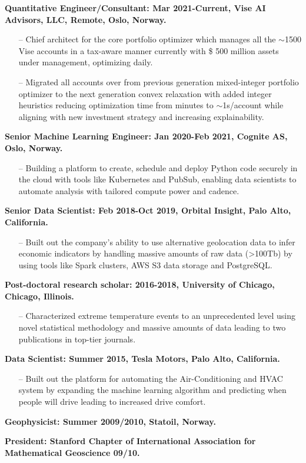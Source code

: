\documentclass[letterpaper, 12pt]{article}
\renewenvironment{itemize}{
  \begin{list}{}{
    \setlength{\leftmargin}{1.5em}
  }
}{
  \end{list}
}
\begin{document}
\begin{itemize}
  \item \textbf{Quantitative Engineer/Consultant: Mar 2021-Current, Vise AI Advisors, LLC, Remote, Oslo, Norway. }
  \begin{enumerate}
       \item[--] Chief architect for the core portfolio optimizer which manages all the $\sim$1500 Vise accounts in a tax-aware manner currently with \$ 500 million assets under management, optimizing daily.
       \item[--] Migrated all accounts over from previous generation mixed-integer portfolio optimizer to the next generation convex relaxation with added integer heuristics reducing optimization time from minutes to $\sim$1s/account while aligning with new investment strategy and increasing explainability.
   \end{enumerate}
  
  \item \textbf{Senior Machine Learning Engineer: Jan 2020-Feb 2021, Cognite AS, Oslo, Norway. }
  \begin{enumerate}
       \item[--] Building a platform to create, schedule and deploy Python code securely in the cloud with tools like Kubernetes and PubSub, enabling data scientists to automate analysis with tailored compute power and cadence.
   \end{enumerate}
  \item \textbf{Senior Data Scientist: Feb 2018-Oct 2019, Orbital Insight, Palo Alto, California. }
  \begin{enumerate}
       \item[--] Built out the company's ability to use alternative geolocation data to infer economic indicators by handling massive amounts of raw data (>100Tb) by using tools like Spark clusters, AWS S3 data storage and PostgreSQL.
   \end{enumerate}
  \newpage
  \item \textbf{Post-doctoral research scholar: 2016-2018, University of Chicago, Chicago, Illinois.}
  \begin{enumerate}
       \item[--] Characterized extreme temperature events to an unprecedented level using novel statistical methodology and massive amounts of data leading to two publications in top-tier journals. 
   \end{enumerate}
  \item \textbf{Data Scientist: Summer 2015, Tesla Motors, Palo Alto, California.}
  \begin{enumerate}
       \item[--] Built out the platform for automating the Air-Conditioning and HVAC system by expanding the machine learning algorithm and predicting when people will drive leading to increased drive comfort.
   \end{enumerate}
  \item \textbf{Geophysicist: Summer 2009/2010, Statoil, Norway.}
  \item \textbf{President: Stanford Chapter of International Association
          for Mathematical Geoscience 09/10.}
\end{itemize}
\end{document}
